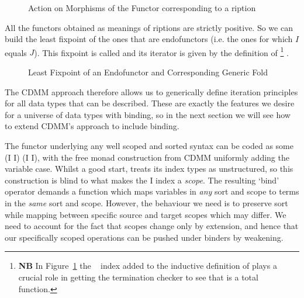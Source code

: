 \begin{figure}[h]
\caption{Action on Morphisms of the Functor corresponding to a ription}
\end{figure}

All the functors obtained as meanings of riptions are strictly
positive. So we can build the least fixpoint of the ones that are endofunctors
(i.e. the ones for which $I$ equals $J$). This fixpoint is called 
and its iterator is given by the definition of  %
\footnote{\textbf{NB}
In Figure~\ref{figure:datamu} the ~\cite{DBLP:journals/corr/abs-1012-4896} index added
to the inductive definition of  plays a crucial role in getting the
termination checker to see that  is a total function.
}
.

\begin{figure}[h]
\caption{Least Fixpoint of an Endofunctor and Corresponding Generic Fold}\label{figure:datamu}
\end{figure}


The CDMM approach therefore allows us to generically define iteration principles
for all data types that can be described. These are exactly the features we desire
for a universe of data types with binding, so in the next section we will see how
to extend CDMM's approach to include binding.

The functor underlying any well scoped and sorted syntax can be coded as some
{ (I \AR{$\times$}  I) (I \AR{$\times$}  I)}, with the
free monad construction from CDMM uniformly adding the variable case. Whilst a
good start,  treats its index types as unstructured, so this construction
is blind to what makes the { I} index a \emph{scope}. The resulting
`bind' operator demands a function which maps variables in \emph{any} sort and
scope to terms in the \emph{same} sort and scope. However, the behaviour we need
is to preserve sort while mapping between specific source and target scopes which
may differ. We need to account for the fact that scopes change only by extension,
and hence that our specifically scoped operations can be pushed under binders by
weakening.




